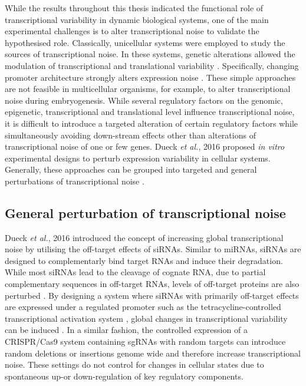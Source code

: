 While the results throughout this thesis indicated the functional role of transcriptional variability in dynamic biological systems, one of the main experimental challenges is to alter transcriptional noise to validate the hypothesised role. 
Classically, unicellular systems were employed to study the sources of transcriptional noise. In these systems, genetic alterations allowed the modulation of transcriptional and translational variability \cite{Raser2004, Raser2005, Ozbudak2002, Hornung2012}. 
Specifically, changing promoter architecture strongly alters expression noise \cite{Jones2014, Sharon2014}. 
These simple approaches are not feasible in multicellular organisms, for example, to alter transcriptional noise during embryogenesis. 
While several regulatory factors on the genomic, epigenetic, transcriptional and translational level influence transcriptional noise, it is difficult to introduce a targeted alteration of certain regulatory factors while simultaneously avoiding down-stream effects other than alterations of transcriptional noise of one or few genes. 
Dueck \emph{et al.}, 2016 proposed \emph{in vitro} experimental designs to perturb expression variability in cellular systems. 
Generally, these approaches can be grouped into targeted and general perturbations of transcriptional noise \citep{Dueck2016}.

\subsection{General perturbation of transcriptional noise} 

Dueck \emph{et al.}, 2016 introduced the concept of increasing global transcriptional noise by utilising the off-target effects of \glspl{siRNA}. 
Similar to miRNAs, siRNAs are designed to complementarly bind target RNAs and induce their degradation. While most siRNAs lead to the cleavage of cognate RNA, due to partial complementary sequences in off-target RNAs, levels of off-target proteins are also perturbed \citep{Scacheri2004}. 
By designing a system where siRNAs with primarily off-target effects are expressed under a regulated promoter such as the tetracycline-controlled transcriptional activation system \citep{Gossen1995}, global changes in transcriptional variability can be induced \citep{Dueck2016}. 
In a similar fashion, the controlled expression of a CRISPR/Cas9 system containing \glspl{sgRNA} with random targets can introduce random deletions or insertions genome wide and therefore increase transcriptional noise. 
These settings do not control for changes in cellular states due to spontaneous up-or down-regulation of key regulatory components. 

